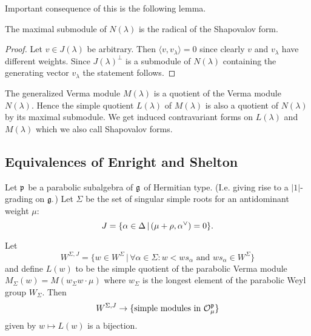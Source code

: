 Important consequence of this is the following lemma.
\begin{lemma}
The maximal submodule of $N(\lambda)$ is the radical of the Shapovalov form.
\end{lemma}
\begin{proof}
Let $v\in J(\lambda)$  be arbitrary. Then $\langle v, v_\lambda \rangle = 0$ since clearly $v$ and $v_\lambda$ have different weights. Since $J(\lambda)^\perp$ is a submodule of $N(\lambda)$ containing the generating vector $v_\lambda$ the statement follows.
\end{proof}

The generalized Verma module $M(\lambda)$ is a quotient of the Verma module $N(\lambda)$. Hence the simple quotient $L(\lambda)$ of $M(\lambda)$ is also a quotient of $N(\lambda)$ by its maximal submodule. We get induced contravariant forms on $L(\lambda)$ and $M(\lambda)$  which we also call Shapovalov forms.


\subsection{Equivalences of Enright and Shelton}\label{sec:es_equivalence}


Let $\mathfrak{p}$ be a parabolic subalgebra of $\mathfrak{g}$ of Hermitian type. (I.e. giving rise to a $|1|$-grading on $\mathfrak{g}.$) Let $\Sigma$ be the set of singular simple roots for an antidominant weight $\mu$:
\[
J = \{ \alpha \in \Delta \,|\, (\mu + \rho, \alpha^\vee) = 0 \}. 
\]
\begin{theorem}\label{thm:es_equivalence}
Let
\[
W^{\Sigma, J} = \{ w \in W^\Sigma \, | \,  \forall \alpha \in \Sigma  :  w < ws_\alpha \text{ and } ws_\alpha \in W^\Sigma\}
\]
and define $L(w)$ to be the simple quotient of the parabolic Verma module $M_\Sigma(w) = M(w_\Sigma w \cdot \mu)$ where $w_\Sigma$ is the longest element of the parabolic Weyl group $W_\Sigma$. Then 
\[
W^{\Sigma, J} \to \{ \text{simple modules in } \mathcal{O}^{\mathfrak{p}}_\mu \}
\]
given by $w \mapsto L(w)$ is a bijection.
\end{theorem}

